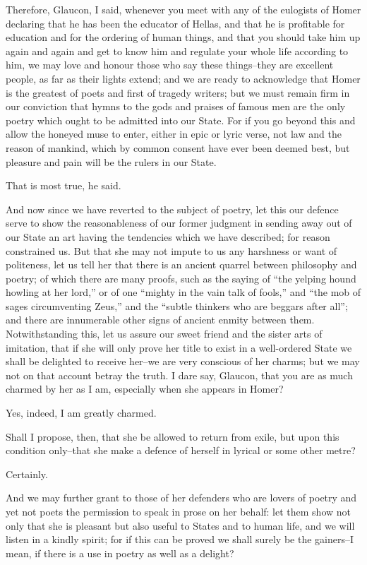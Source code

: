 Therefore, Glaucon, I said, whenever you meet with any of the eulogists
of Homer declaring that he has been the educator of Hellas, and that he
is profitable for education and for the ordering of human things, and
that you should take him up again and again and get to know him and
regulate your whole life according to him, we may love and honour those
who say these things--they are excellent people, as far as their lights
extend; and we are ready to acknowledge that Homer is the greatest
of poets and first of tragedy writers; but we must remain firm in our
conviction that hymns to the gods and praises of famous men are the only
poetry which ought to be admitted into our State. For if you go beyond
this and allow the honeyed muse to enter, either in epic or lyric verse,
not law and the reason of mankind, which by common consent have ever
been deemed best, but pleasure and pain will be the rulers in our State.

That is most true, he said.

And now since we have reverted to the subject of poetry, let this our
defence serve to show the reasonableness of our former judgment in
sending away out of our State an art having the tendencies which we have
described; for reason constrained us. But that she may not impute to us
any harshness or want of politeness, let us tell her that there is an
ancient quarrel between philosophy and poetry; of which there are many
proofs, such as the saying of ``the yelping hound howling at her lord,''
or of one ``mighty in the vain talk of fools,'' and ``the mob of sages
circumventing Zeus,'' and the ``subtle thinkers who are beggars after
all''; and there are innumerable other signs of ancient enmity between
them. Notwithstanding this, let us assure our sweet friend and the
sister arts of imitation, that if she will only prove her title to exist
in a well-ordered State we shall be delighted to receive her--we are
very conscious of her charms; but we may not on that account betray the
truth. I dare say, Glaucon, that you are as much charmed by her as I am,
especially when she appears in Homer?

Yes, indeed, I am greatly charmed.

Shall I propose, then, that she be allowed to return from exile, but
upon this condition only--that she make a defence of herself in lyrical
or some other metre?

Certainly.

And we may further grant to those of her defenders who are lovers of
poetry and yet not poets the permission to speak in prose on her behalf:
let them show not only that she is pleasant but also useful to States
and to human life, and we will listen in a kindly spirit; for if this
can be proved we shall surely be the gainers--I mean, if there is a use
in poetry as well as a delight?

